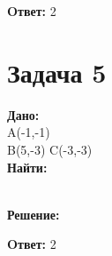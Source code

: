 \documentclass{article}
\begin{document}
\textbf{Oтвет: }2 

\section*{Задача 5}

\begin{minipage}[t]{0.45\textwidth}
   
\textbf{Дано:} \\ 
A(-1,-1)\\ 
B(5,-3)
C(-3,-3)\\
\textbf{Найти: }
\end{minipage}
\begin{minipage}[t]{0.45\textwidth}
	\vspace{-\baselineskip} %

\begin{center}
\end{center}
\end{minipage}
\\
\textbf{Решение:}
\begin{enumerate}
\end{enumerate}

\textbf{Oтвет: }2 
\end{document}

